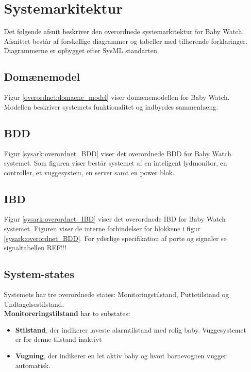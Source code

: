 \section{Systemarkitektur}

Det følgende afsnit beskriver den overordnede systemarkitektur for Baby Watch. Afsnittet består af forskellige diagrammer og tabeller med tilhørende forklaringer. Diagrammerne er opbygget efter SysML standarten.

\subsection{Domænemodel}

Figur \ref{overordnet:domaene_model} viser domænemodellen for Baby Watch. Modellen beskriver systemets funktionalitet og indbyrdes sammenhæng. 

\subsection{BDD}
Figur \ref{sysark:overordnet_BDD} viser det overordnede BDD for Baby Watch systemet. Som figuren viser består systemet af en inteligent lydmonitor, en controller, et vuggesystem, en server samt en power blok. 


\subsection{IBD}

Figur \ref{sysark:overordnet_IBD} viser det overordnede IBD for Baby Watch systemet.  Figuren viser de interne forbindelser for blokkene i figur \ref{sysark:overordnet_BDD}. For yderlige specifikation af porte og signaler se signaltabellen REF!!!


\subsection{System-states}


Systemets har tre overordnede states: Monitoringstilstand, Puttetilstand og Undtagelsestilstand. \\\textbf{Monitoreringstilstand} har to substates: 
\begin{itemize}
	\item \textbf{Stilstand}, der indikerer laveste alarmtilstand med rolig baby. Vuggesystemet er for denne tilstand inaktivt
	\item \textbf{Vugning}, der indikerer en let aktiv baby og hvori barnevognen vugger automatisk.
\end{itemize}

